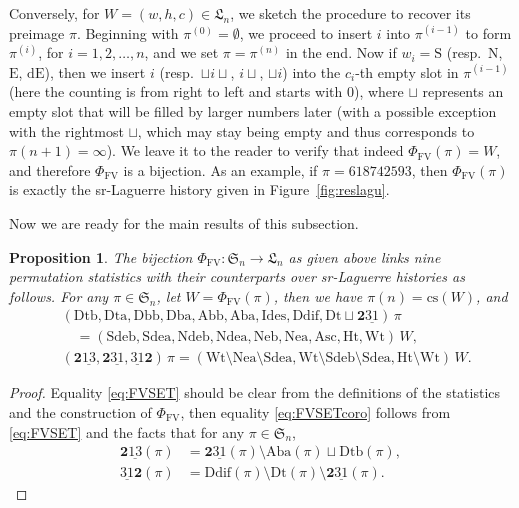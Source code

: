 \documentclass[12pt]{amsart}
\numberwithin{equation}{section}
\theoremstyle{plain}
\newtheorem{proposition}[theorem]{Proposition}
\theoremstyle{definition}
\def\FV{\mathrm{FV}}
\def\SS{\mathfrak{S}}
\def\LH{\mathfrak{L}}
\def\N{\mathrm{N}}
\def\S{\mathrm{S}}
\def\E{\mathrm{E}}
\def\dE{\mathrm{dE}}
\def\cs{\mathrm{cs}}
\def\Neb{\mathrm{Neb}}
\def\Nea{\mathrm{Nea}}
\def\Sdeb{\mathrm{Sdeb}}
\def\Sdea{\mathrm{Sdea}}
\def\Ndeb{\mathrm{Ndeb}}
\def\Ndea{\mathrm{Ndea}}
\def\Het{\mathrm{Ht}}
\def\Wt{\mathrm{Wt}}
\def\Asc{\mathrm{Asc}}
\def\Id{\mathrm{Ides}}
\def\Dt{\mathrm{Dt}}
\def\Ddif{\mathrm{Ddif}}
\def\Dtb{\mathrm{Dtb}}
\def\Dta{\mathrm{Dta}}
\def\Dbb{\mathrm{Dbb}}
\def\Dba{\mathrm{Dba}}
\def\Abb{\mathrm{Abb}}
\def\Aba{\mathrm{Aba}}
\def\rightascent{{\mathbf{2}\underline{13}}}
\def\leftdescent{\mathrm{\underline{31}}\mathbf{2}}
\def\rightdescent{\mathrm{\mathbf{2}\underline{31}}}
\begin{document}
Conversely, for $W=(w,h,c)\in\LH_n$, we sketch the procedure to recover its preimage $\pi$. Beginning with $\pi^{(0)}=\emptyset$, we proceed to insert $i$ into $\pi^{(i-1)}$ to form $\pi^{(i)}$, for $i=1,2,\ldots,n$, and we set $\pi=\pi^{(n)}$ in the end. Now if $w_i=\S$ (resp.~$\N$, $\E$, $\dE$), then we insert $i$ (resp.~$\sqcup i \sqcup$, $i\sqcup$, $\sqcup i$) into the $c_i$-th empty slot in $\pi^{(i-1)}$ (here the counting is from right to left and starts with $0$), where $\sqcup$ represents an empty slot that will be filled by larger numbers later (with a possible exception with the rightmost $\sqcup$, which may stay being empty and thus corresponds to $\pi(n+1)=\infty$). We leave it to the reader to verify that indeed $\Phi_{\FV}(\pi)=W$, and therefore $\Phi_{\FV}$ is a bijection. As an example, if $\pi=618742593$, then $\Phi_{\FV}(\pi)$ is exactly the sr-Laguerre history given in Figure~\ref{fig:reslagu}.

Now we are ready for the main results of this subsection.

\begin{proposition}\label{prop:FV}
The bijection $\Phi_{\FV}:\SS_n\rightarrow \LH_n$ as given above links nine permutation statistics with their counterparts over sr-Laguerre histories as follows. For any $\pi\in\SS_n$, let $W=\Phi_{\FV}(\pi)$, then we have $\pi(n)=\cs(W)$, and
\begin{align}
\label{eq:FVSET}
& (\Dtb,\Dta,\Dbb,\Dba,\Abb,\Aba,\Id,\Ddif,\Dt\sqcup\rightdescent )\,\pi \\[3pt]
& \quad = (\Sdeb,\Sdea,\Ndeb,\Ndea,\Neb,\Nea, \Asc,\Het,\Wt)\,W,  \nonumber \\
\label{eq:FVSETcoro}
& (\rightascent, \rightdescent, \leftdescent)\,\pi =( \Wt\setminus\Nea\setminus\Sdea,
\Wt\setminus\Sdeb\setminus\Sdea,\Het\setminus\Wt)\,W.
\end{align}
\end{proposition}

\begin{proof}
Equality \eqref{eq:FVSET} should be clear from the definitions of the statistics and the construction of $\Phi_{\FV}$, then equality \eqref{eq:FVSETcoro} follows from \eqref{eq:FVSET} and the facts that for any $\pi \in \SS_n$,
\begin{align*}
  \rightascent(\pi) & = \rightdescent(\pi) \setminus \Aba(\pi) \sqcup \Dtb(\pi),\\[3pt]
  \leftdescent(\pi) & = \Ddif(\pi) \setminus \Dt(\pi) \setminus \rightdescent(\pi).
\end{align*}
\end{proof}
\end{document}
